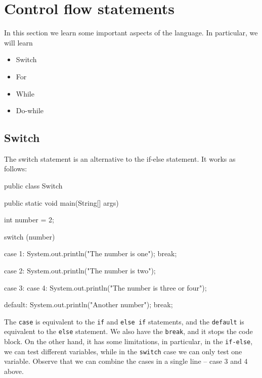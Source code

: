 \section{Control flow statements}

In this section we learn some important aspects of the language. In particular, we will learn
\begin{itemize}
    \item Switch
    \item For
    \item While 
    \item Do-while
\end{itemize}

\subsection{Switch}

The switch statement is an alternative to the if-else statement. It works as follows:
\begin{listing}{1}
public class Switch {
    public static void main(String[] args) {
   
    int number = 2;

    switch (number) {
        case 1:
            System.out.println("The number is one");
            break;

        case 2:
            System.out.println("The number is two");

        case 3: case 4: 
            System.out.println("The number is three or four");

        default:
            System.out.println("Another number");
            break;
    }

   }
}
\end{listing}
The \verb|case| is equivalent to the \verb|if| and \verb|else if| statements, and the \verb|default|
is equivalent to the \verb|else| statement. We also have the \verb|break|, and it stops the code block.
On the other hand, it has some limitations, in particular, in the \verb|if-else|, we can test different
variables, while in the \verb|switch| case we can only test one variable. Observe that we can combine
the cases in a single line -- case 3 and 4 above. 

